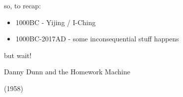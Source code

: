 \documentclass{beamer}
\begin{document}
\begin{frame}[plain]
\end{frame}



\begin{frame}{so, to recap:}
	\begin{itemize}
		\item 1000BC - Yijing / I-Ching
		\pause
		\item 1000BC-2017AD - some inconsequential stuff happens
	\end{itemize}
\end{frame}

\begin{frame}[c]
	but wait!
	
	\centering
	\Huge
	Danny Dunn and the Homework Machine
	
	(1958)
\end{frame}

\begin{frame}[plain]
\end{frame}
\end{document}
